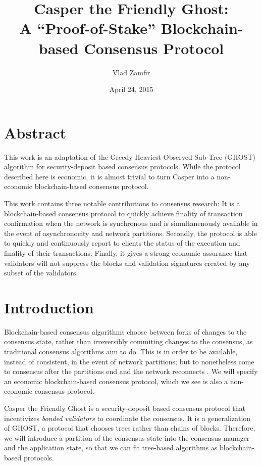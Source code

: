 \documentclass[11pt,a4paper]{article}
\title{Casper the Friendly Ghost: \\
		\vspace{2.5mm}
		\small A ``Proof-of-Stake'' Blockchain-based Consensus Protocol}
\date{April 24, 2015}
\author{Vlad Zamfir}
\begin{document}
\maketitle%

\tableofcontents

\pagebreak

\section{Abstract}

This work is an adaptation of the Greedy Heaviest-Observed Sub-Tree\cite{GHOST} (GHOST) algorithm for security-deposit based consensus protocols. While the protocol described here is economic, it is almost trivial to turn Casper into a non-economic blockchain-based consensus protocol. 

This work contains three notable contributions to consensus research: It is a blockchain-based consensus protocol to quickly achieve finality of transaction confirmation when the network is synchronous and is simultanenously available in the event of asynchronocity and network partitions. Secondly, the protocol is able to quickly and continuously report to clients the status of the execution and finality of their transactions. Finally, it gives a strong economic assurance that validators will not suppress the blocks and validation signatures created by any subset of the validators.


\section{Introduction}

Blockchain-based consensus algorithms choose between forks of changes to the consensus state, rather than irreversibly commiting changes to the consensus, as traditional consensus algorithms aim to do. This is in order to be available, instead of consistent, in the event of network partitions; but to nonetheless come to consensus after the partitions end and the network reconnects \cite{ReformalizingConsensus}. We will specify an economic blockchain-based consensus protocol, which we see is also a non-economic consensus protocol. 

Casper the Friendly Ghost is a security-deposit based consensus protocol that incentivizes \emph{bonded validators} to coordinate the consensus. It is a generalization of GHOST, a protocol that chooses trees rather than chains of blocks. Therefore, we will introduce a partition of the consensus state into the consensus manager and the application state, so that we can fit tree-based algorithms as blockchain-based protocols.
\end{document}

